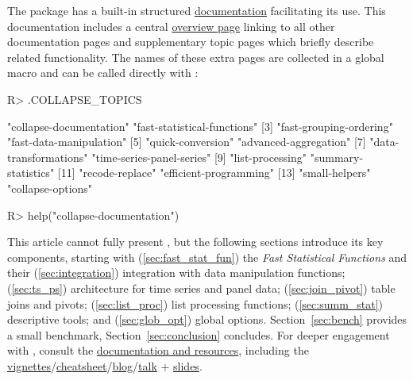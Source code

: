 \documentclass[nojss]{jss} %
\begin{document}
The package has a built-in structured \href{https://sebkrantz.github.io/collapse/reference/index.html}{documentation} facilitating its use. This documentation includes a central \href{https://sebkrantz.github.io/collapse/reference/collapse-documentation.html}{overview page} linking to all other documentation pages and supplementary topic pages which briefly describe related functionality. The names of these extra pages are collected in a global macro  and can be called directly with :
%
\begin{Schunk}
\begin{Sinput}
R> .COLLAPSE_TOPICS
\end{Sinput}
\begin{Soutput}
 [1] "collapse-documentation"     "fast-statistical-functions"
 [3] "fast-grouping-ordering"     "fast-data-manipulation"
 [5] "quick-conversion"           "advanced-aggregation"
 [7] "data-transformations"       "time-series-panel-series"
 [9] "list-processing"            "summary-statistics"
[11] "recode-replace"             "efficient-programming"
[13] "small-helpers"              "collapse-options"
\end{Soutput}
\begin{Sinput}
R> help("collapse-documentation")
\end{Sinput}
\end{Schunk}
%
This article cannot fully present , but the following sections introduce its key components, starting with (\ref{sec:fast_stat_fun}) the \emph{Fast Statistical Functions} and their (\ref{sec:integration}) integration with data manipulation functions; (\ref{sec:ts_ps}) architecture for time series and panel data; (\ref{sec:join_pivot}) table joins and pivots; (\ref{sec:list_proc}) list processing functions; (\ref{sec:summ_stat}) descriptive tools; and (\ref{sec:glob_opt}) global options. Section~\ref{sec:bench} provides a small benchmark, Section~\ref{sec:conclusion} concludes. For deeper engagement with , consult the \href{https://sebkrantz.github.io/collapse/articles/collapse_documentation.html}{documentation and resources}, including the \href{https://sebkrantz.github.io/collapse/articles/index.html}{vignettes}/\href{https://raw.githubusercontent.com/SebKrantz/collapse/master/misc/collapse\%20cheat\%20sheet/collapse_cheat_sheet.pdf}{cheatsheet}/\href{https://sebkrantz.github.io/Rblog/}{blog}/\href{https://www.youtube.com/watch?v=OwWT1-dSEts}{talk} $+$ \href{https://raw.githubusercontent.com/SebKrantz/collapse/master/misc/useR2022\%20presentation/collapse_useR2022_final.pdf}{slides}.
%
\end{document}
